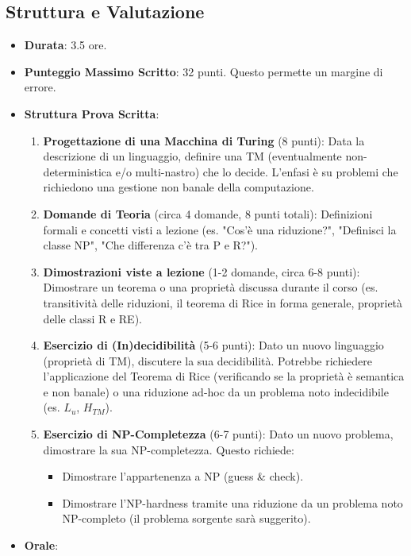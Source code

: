 \documentclass[a4paper]{article}
\theoremstyle{definition} %
\begin{document}
\subsection{Struttura e Valutazione}
\begin{itemize}
    \item \textbf{Durata}: 3.5 ore.
    \item \textbf{Punteggio Massimo Scritto}: 32 punti. Questo permette un margine di errore.
    \item \textbf{Struttura Prova Scritta}:
    \begin{enumerate}
        \item \textbf{Progettazione di una Macchina di Turing} (8 punti): Data la descrizione di un linguaggio, definire una TM (eventualmente non-deterministica e/o multi-nastro) che lo decide. L'enfasi è su problemi che richiedono una gestione non banale della computazione.
        \item \textbf{Domande di Teoria} (circa 4 domande, 8 punti totali): Definizioni formali e concetti visti a lezione (es. "Cos'è una riduzione?", "Definisci la classe NP", "Che differenza c'è tra P e R?").
        \item \textbf{Dimostrazioni viste a lezione} (1-2 domande, circa 6-8 punti): Dimostrare un teorema o una proprietà discussa durante il corso (es. transitività delle riduzioni, il teorema di Rice in forma generale, proprietà delle classi R e RE).
        \item \textbf{Esercizio di (In)decidibilità} (5-6 punti): Dato un nuovo linguaggio (proprietà di TM), discutere la sua decidibilità. Potrebbe richiedere l'applicazione del Teorema di Rice (verificando se la proprietà è semantica e non banale) o una riduzione ad-hoc da un problema noto indecidibile (es. $L_u$, $H_{TM}$).
        \item \textbf{Esercizio di NP-Completezza} (6-7 punti): Dato un nuovo problema, dimostrare la sua NP-completezza. Questo richiede:
        \begin{itemize}
            \item Dimostrare l'appartenenza a NP (guess \& check).
            \item Dimostrare l'NP-hardness tramite una riduzione da un problema noto NP-completo (il problema sorgente sarà suggerito).
        \end{itemize}
    \end{enumerate}
    \item \textbf{Orale}:
    \begin{itemize}

\end{itemize}
\end{itemize}
\end{document}

